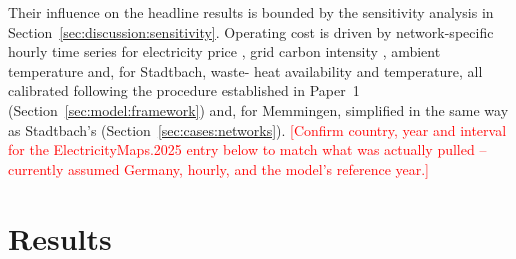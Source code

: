 \documentclass[review,3p]{elsarticle}
\newcommand{\placeholder}[1]{\textcolor{red}{[#1]}}
\begin{document}
Their influence on the
headline results is bounded by the sensitivity analysis in
Section~\ref{sec:discussion:sensitivity}. Operating cost is driven by
network-specific hourly time series for electricity price
\cite{ENTSOE.2025}, grid carbon
intensity \cite{ElectricityMaps.2025}, ambient temperature and, for Stadtbach, waste-
heat availability and temperature, all calibrated following the
procedure established in Paper~1 \cite{Ruess.2026}
(Section~\ref{sec:model:framework}) and, for Memmingen, simplified in
the same way as Stadtbach's (Section~\ref{sec:cases:networks}).
\placeholder{Confirm country, year and interval for the
ElectricityMaps.2025 entry below to match what was actually pulled --
currently assumed Germany, hourly, and the model's reference year.}

\section{Results}
\label{sec:results}
\end{document}
